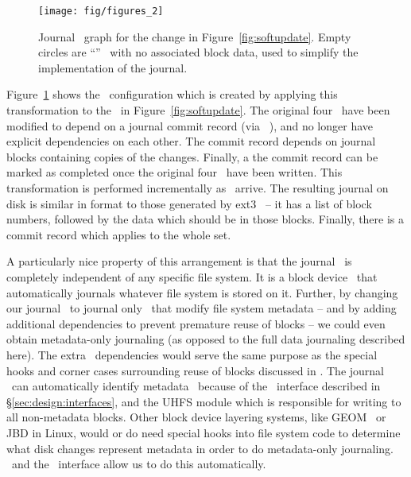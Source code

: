 \begin{figure}
  \centering
  \texttt{[image: fig/figures\_2]}
  \caption{\label{fig:journal} Journal \chdesc\ graph for the
    change in Figure~\ref{fig:softupdate}. Empty circles are
    ``\noop'' \chdescs\ with no associated block data, used
    to simplify the implementation of the journal.}
\end{figure}

Figure~\ref{fig:journal} shows the \chdesc\ configuration which is created by
applying this transformation to the \chdescs\ in Figure~\ref{fig:softupdate}.
The original four \chdescs\ have been modified to depend on a journal commit
record (via \anoop\ \chdesc), and no longer have explicit dependencies on each
other. The commit record depends on journal blocks containing copies of the
changes. Finally, a the commit record can be marked as completed once the
original four \chdescs\ have been written. This transformation is performed
incrementally as \chdescs\ arrive. The resulting journal on disk is similar in
format to those generated by ext3~\cite{tweedie98journaling} -- it has a list of
block numbers, followed by the data which should be in those blocks. Finally,
there is a commit record which applies to the whole set.

A particularly nice property of this arrangement is that the journal \module\ is
completely independent of any specific file system. It is a block device
\module\ that automatically journals whatever file system is stored on it.
Further, by changing our journal \module\ to journal only \chdescs\ that modify
file system metadata -- and by adding additional dependencies to prevent
premature reuse of blocks -- we could even obtain metadata-only journaling (as
opposed to the full data journaling described here). The extra \chdesc\
dependencies would serve the same purpose as the special hooks and corner cases
surrounding reuse of blocks discussed in \cite{tweedie00ext3}. The journal
\module\ can automatically identify metadata \chdescs\ because of the \LFS\
interface described in \S\ref{sec:design:interfaces}, and the UHFS module which
is responsible for writing to all non-metadata blocks. Other block device
layering systems, like GEOM~\cite{geom} or JBD in Linux, would or do need
special hooks into file system code to determine what disk changes represent
metadata in order to do metadata-only journaling. \Chdescs\ and the \LFS\
interface allow us to do this automatically.
